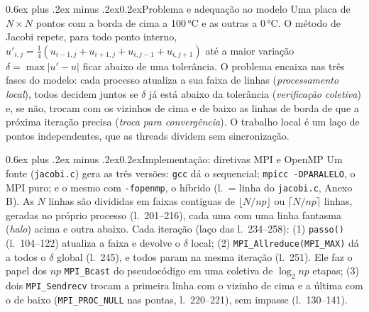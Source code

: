 \documentclass[10pt,a4paper,twocolumn]{article}
\makeatletter
\renewcommand\section{\@startsection{section}{1}{0pt}%
  {0.6ex plus .2ex minus .2ex}{0.2ex}{\normalsize\bfseries}}
\makeatother
\begin{document}

\section{Problema e adequação ao modelo}
Uma placa de $N \times N$ pontos com a borda de cima a 100\,°C e as outras
a 0\,°C. O método de Jacobi repete, para todo ponto interno,
$u'_{i,j} = \tfrac14(u_{i-1,j} + u_{i+1,j} + u_{i,j-1} + u_{i,j+1})$ até a
maior variação $\delta = \max|u' - u|$ ficar abaixo de uma tolerância. O
problema encaixa nas três fases do modelo: cada processo atualiza a sua faixa
de linhas (\emph{processamento local}), todos decidem juntos se $\delta$ já
está abaixo da tolerância (\emph{verificação coletiva}) e, se não, trocam com
os vizinhos de cima e de baixo as linhas de borda de que a próxima iteração
precisa (\emph{troca para convergência}). O trabalho local é um laço de
pontos independentes, que as threads dividem sem sincronização.

\section{Implementação: diretivas MPI e OpenMP}
Um fonte (\texttt{jacobi.c}) gera as três versões: \texttt{gcc} dá o
sequencial; \texttt{mpicc -DPARALELO}, o MPI puro; e o mesmo com
\texttt{-fopenmp}, o híbrido (l.~= linha do \texttt{jacobi.c}, Anexo B). As $N$ linhas são divididas em faixas
contíguas de $\lfloor N/np \rfloor$ ou $\lceil N/np \rceil$ linhas, geradas no
próprio processo (l.~201--216), cada uma com uma linha fantasma (\emph{halo}) acima e outra
abaixo. Cada iteração (laço das l.~234--258): (1) \texttt{passo()} (l.~104--122)
atualiza a faixa e devolve o $\delta$ local; (2) \texttt{MPI\_Allreduce(MPI\_MAX)} dá a todos o
$\delta$ global (l.~245), e todos param na mesma iteração (l.~251). Ele faz o papel dos $np$
\texttt{MPI\_Bcast} do pseudocódigo em uma coletiva de $\log_2 np$ etapas;
(3) dois \texttt{MPI\_Sendrecv} trocam a primeira linha com o vizinho de cima
e a última com o de baixo (\texttt{MPI\_PROC\_NULL} nas pontas, l.~220--221), sem
impasse (l.~130--141).
\end{document}
